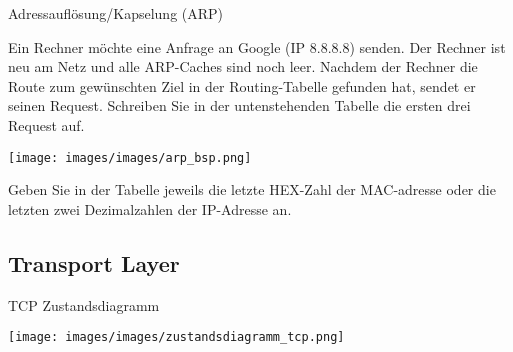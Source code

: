 \begin{example2}{Adressauflösung/Kapselung (ARP)}

  Ein Rechner möchte eine Anfrage an Google (IP 8.8.8.8) senden. Der Rechner ist neu am Netz und alle ARP-Caches sind noch leer. Nachdem der Rechner die Route zum gewünschten Ziel in der Routing-Tabelle gefunden hat, sendet er seinen Request. Schreiben Sie in der untenstehenden Tabelle die ersten drei Request auf.
  
  \texttt{[image: images/images/arp\_bsp.png]}
  
  Geben Sie in der Tabelle jeweils die letzte HEX-Zahl der MAC-adresse oder die letzten zwei Dezimalzahlen der IP-Adresse an.

  \vspace{1mm}

\end{example2}

\subsection*{Transport Layer}

\begin{example2}{TCP Zustandsdiagramm}

  \texttt{[image: images/images/zustandsdiagramm\_tcp.png]}
\end{example2}

